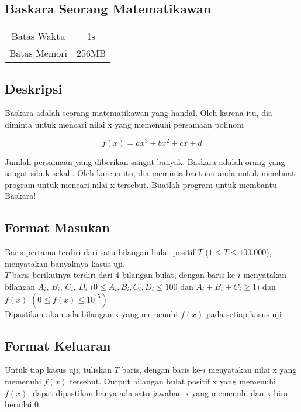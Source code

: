 \documentclass{article}
\begin{document}
\begin{center}

    
    \section*{Baskara Seorang Matematikawan} %

    \begin{tabular}{ | c c | }
        \hline
        Batas Waktu  & 1s \\    %
        Batas Memori & 256MB \\  %
        \hline
    \end{tabular}
\end{center}

\subsection*{Deskripsi}

Baskara adalah seorang matematikawan yang handal. Oleh karena itu, dia diminta untuk mencari nilai x yang memenuhi persamaan polinom

\[ f(x) = ax^3 + bx^2 + cx + d \]

Jumlah persamaan yang diberikan sangat banyak. Baskara adalah orang yang sangat sibuk sekali. Oleh karena itu, dia meminta bantuan anda untuk membuat program untuk mencari nilai x tersebut. Buatlah program untuk membantu Baskara!

\subsection*{Format Masukan}

Baris pertama terdiri dari satu bilangan bulat positif $T$ ($1 \leq T \leq 100.000$), menyatakan banyaknya kasus uji. \\
$T$ baris berikutnya terdiri dari 4 bilangan bulat, dengan baris ke-$i$ menyatakan bilangan $A_i$, $B_i$, $C_i$, $D_i$  $(0 \leq A_i,B_i,C_i,D_i \leq 100 $ dan $ A_i + B_i + C_i \geq 1)$  dan $f(x)$ $(0 \leq f(x) \leq 10^{15} )$\\
Dipastikan akan ada bilangan x yang memenuhi $f(x)$ pada setiap kasus uji

\subsection*{Format Keluaran}

Untuk tiap kasus uji, tuliskan $T$ baris, dengan baris ke-$i$ menyatakan nilai x yang memenuhi $f(x)$ tersebut.
Output bilangan bulat positif x yang memenuhi $f(x)$, dapat dipastikan hanya ada satu jawaban x yang memenuhi dan x bisa bernilai 0.  
\\
\end{document}
